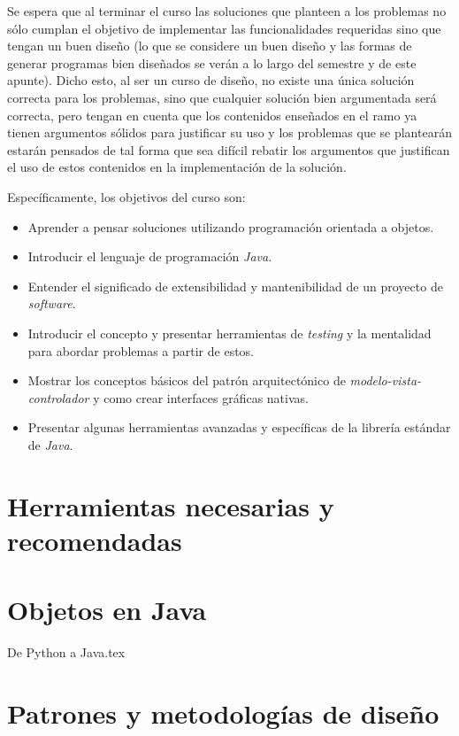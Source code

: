 \documentclass[12pt]{book}
\begin{document}
      Se espera que al terminar el curso las soluciones que planteen a los problemas no
      sólo cumplan el objetivo de implementar las funcionalidades requeridas sino que 
      tengan un buen diseño (lo que se considere un buen diseño y las formas de generar 
      programas bien diseñados se verán a lo largo del semestre y de este apunte).
      Dicho esto, al ser un curso de diseño, no existe una única solución correcta para 
      los problemas, sino que cualquier solución bien argumentada será correcta, pero 
      tengan en cuenta que los contenidos enseñados en el ramo ya tienen argumentos 
      sólidos para justificar su uso y los problemas que se plantearán estarán pensados de
      tal forma que sea difícil rebatir los argumentos que justifican el uso de estos 
      contenidos en la implementación de la solución.

      Específicamente, los objetivos del curso son:

      \begin{itemize}
        \item Aprender a pensar soluciones utilizando programación orientada a objetos.
        \item Introducir el lenguaje de programación \textit{Java}.
        \item Entender el significado de extensibilidad y mantenibilidad de un proyecto de 
          \textit{software}.
        \item Introducir el concepto y presentar herramientas de \textit{testing} y la 
          mentalidad para abordar problemas a partir de estos.
        \item Mostrar los conceptos básicos del patrón arquitectónico de 
          \textit{modelo-vista-controlador} y como crear interfaces gráficas nativas.
        \item Presentar algunas herramientas avanzadas y específicas de la librería 
            estándar de \textit{Java}.
      \end{itemize}

  \mainmatter
  \part{Herramientas necesarias y recomendadas}
    
    
  \part{Objetos en Java}
    
    {De Python a Java.tex}
  \part{Patrones y metodologías de diseño}
\end{document}
